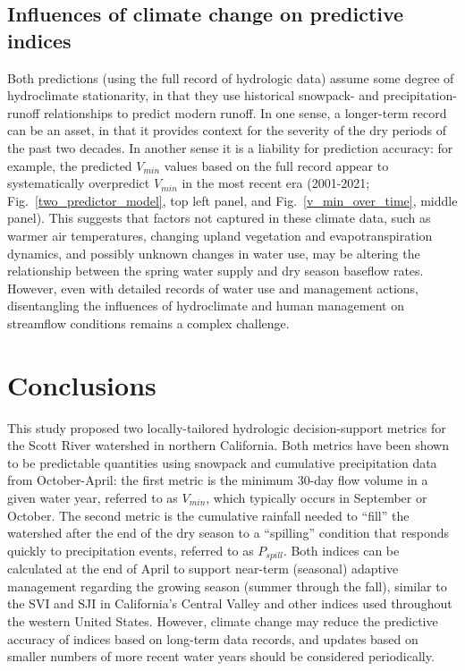 \documentclass[hess, manuscript]{copernicus}
\begin{document}
\subsection{Influences of climate change on predictive indices}

Both predictions (using the full record of hydrologic data) assume some
degree of hydroclimate stationarity, in that they use historical
snowpack- and precipitation-runoff relationships to predict modern
runoff. In one sense, a longer-term record can be an asset, in that it
provides context for the severity of the dry periods of the past two
decades. In another sense it is a liability for prediction accuracy: for
example, the predicted $V_{min}$ values based on the full record
appear to systematically overpredict $V_{min}$ in the most recent era
(2001-2021; Fig.~\ref{two_predictor_model}, top left panel, and
Fig.~\ref{v_min_over_time}, middle panel). This suggests that factors
not captured in these climate data, such as warmer air temperatures,
changing upland vegetation and evapotranspiration dynamics, and possibly
unknown changes in water use, may be altering the relationship between
the spring water supply and dry season baseflow rates. However, even
with detailed records of water use and management actions, disentangling
the influences of hydroclimate and human management on streamflow
conditions remains a complex challenge.

\section{Conclusions}

This study proposed two locally-tailored hydrologic decision-support
metrics for the Scott River watershed in northern California. Both
metrics have been shown to be predictable quantities using snowpack and
cumulative precipitation data from October-April: the first metric is
the minimum 30-day flow volume in a given water year, referred to as
$V_{min}$, which typically occurs in September or October. The second
metric is the cumulative rainfall needed to ``fill'' the watershed after
the end of the dry season to a ``spilling'' condition that responds
quickly to precipitation events, referred to as $P_{spill}$. Both
indices can be calculated at the end of April to support near-term
(seasonal) adaptive management regarding the growing season (summer
through the fall), similar to the SVI and SJI in California's Central
Valley and other indices used throughout the western United States.
However, climate change may reduce the predictive accuracy of indices
based on long-term data records, and updates based on smaller numbers of
more recent water years should be considered periodically.
\end{document}

